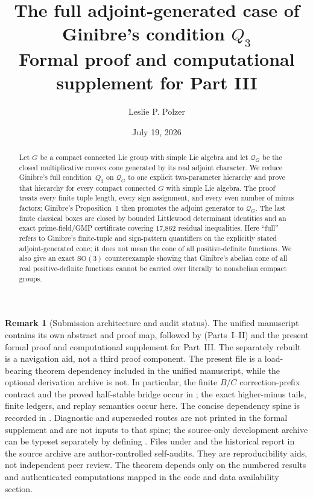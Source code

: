 \documentclass[11pt,reqno]{amsart}
\title[Formal supplement: full adjoint-generated Ginibre $Q_3$]{The full adjoint-generated case of Ginibre's condition \texorpdfstring{$Q_3$}{Q3}\\
\large Formal proof and computational supplement for Part III}
\author{Leslie P. Polzer}
\date{July 19, 2026}
\theoremstyle{plain}
\theoremstyle{definition}
\newtheorem{remark}[theorem]{Remark}
\newcommand{\Qcone}{\mathcal Q}
\begin{document}
\begin{abstract}
Let $G$ be a compact connected Lie group with simple Lie algebra and let
$\Qcone_G$ be the closed multiplicative convex cone generated by its real
adjoint character.  We reduce Ginibre's full condition~$Q_3$ on $\Qcone_G$
to one explicit two-parameter hierarchy and prove that hierarchy for every
compact connected $G$ with simple Lie algebra.  The proof treats every finite
tuple length, every sign assignment, and every even number of minus factors;
Ginibre's Proposition~1 then promotes the adjoint generator to $\Qcone_G$.
The last finite classical boxes are closed by bounded Littlewood determinant
identities and an exact prime-field/GMP certificate covering 17,862 residual
inequalities.  Here ``full'' refers to Ginibre's finite-tuple and sign-pattern
quantifiers on the explicitly stated adjoint-generated cone; it does not mean
the cone of all positive-definite functions.  We also give an exact
$\mathrm{SO}(3)$ counterexample showing
that Ginibre's abelian cone of all real positive-definite functions cannot be
carried over literally to nonabelian compact groups.
\end{abstract}

\maketitle

\begin{remark}[Submission architecture and audit status]
\label{rem:submission-architecture}
The unified manuscript  contains its own abstract and
proof map, followed by  (Parts~I--II) and the present formal
proof and computational supplement for Part~III.  The separately rebuilt
 is a navigation aid, not a third proof component.
The present file is a load-bearing theorem dependency included in the unified
manuscript, while the optional
 derivation archive is not.  In particular, the finite
$B/C$ correction-prefix contract and the proved half-stable bridge occur in
; the exact higher-minus tails, finite ledgers, and replay
semantics occur here.  The concise dependency spine is recorded in
.
Diagnostic and superseded routes are not printed in the formal supplement
and are not inputs to that spine; the source-only development archive can be
typeset separately by defining \texttt{\string\GinibreDevelopmentArchive}.
Files under  and the
historical report in the source archive are author-controlled self-audits.
They are reproducibility aids, not independent peer review.  The theorem
depends only on the numbered results and authenticated computations mapped in
the code and data availability section.
\end{remark}
\end{document}
